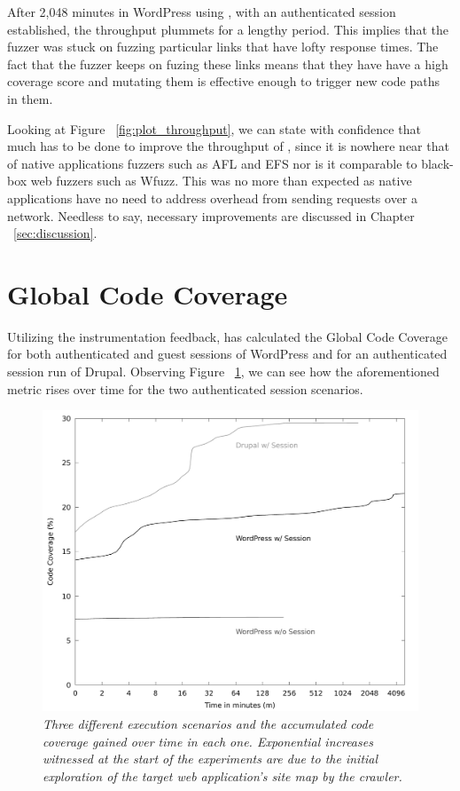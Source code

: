 After 2,048 minutes in WordPress using \pname{}, with an authenticated session established, the throughput plummets for a lengthy period. This implies that the fuzzer was stuck on fuzzing particular links that have lofty response times. The fact that the fuzzer keeps on fuzing these links means that they have have a high coverage score and mutating them is effective enough to trigger new code paths in them.

Looking at Figure ~\ref{fig:plot_throughput}, we can state with confidence that much has to be done to improve the throughput of \pname{}, since it is nowhere near that of native applications fuzzers such as AFL and EFS nor is it comparable to black-box web fuzzers such as Wfuzz. This was no more than expected as native applications have no need to address overhead from sending requests over a network. Needless to say, necessary improvements are discussed in Chapter ~\ref{sec:discussion}.

\section{Global Code Coverage}
Utilizing the instrumentation feedback, \pname{} has calculated the Global Code Coverage for both authenticated and guest sessions of WordPress and for an authenticated session run of Drupal. Observing Figure ~\ref{fig:plot_coverage}, we can see how the aforementioned metric rises over time for the two authenticated session scenarios.

\begin{figure}[!htb]
  \centering \includegraphics[width=\linewidth]{figures/plot_coverage.pdf}
  \captionsetup{justification=centering}
  \caption[Accumulated Global Code Coverage using \pname{}]{\textit{Three different execution scenarios and the accumulated code coverage gained over time in each one. Exponential increases witnessed at the start of the experiments are due to the initial exploration of the target web application's site map by the crawler.}} 
  \label{fig:plot_coverage}
\end{figure}

